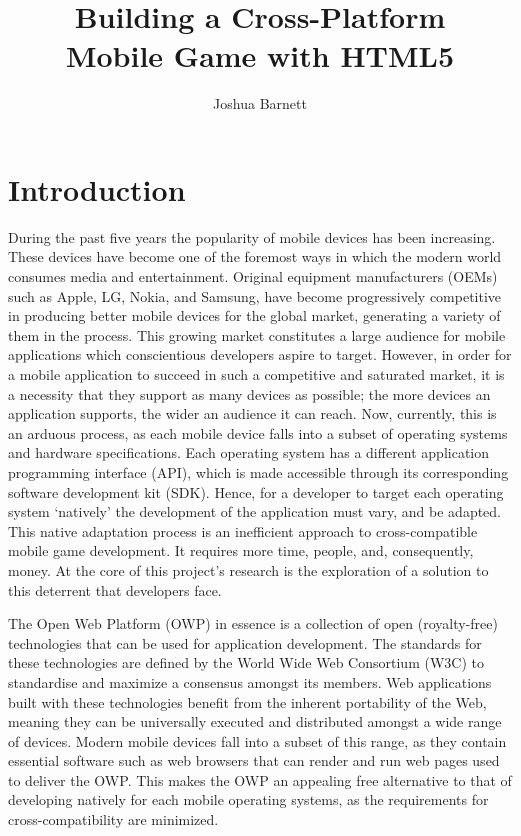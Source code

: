 \documentclass[final]{cmpreport}
\title{Building a Cross-Platform\\Mobile Game with HTML5}
\author{Joshua Barnett}
\begin{document}
\section{Introduction}
\label{sec:intro}

During the past five years the popularity of mobile devices has been increasing. These devices have become one of the foremost ways in which the modern world consumes media and entertainment. Original equipment manufacturers (OEMs) such as Apple, LG, Nokia, and Samsung, have become progressively competitive in producing better mobile devices for the global market, generating a variety of them in the process. This growing market constitutes a large audience for mobile applications which conscientious developers aspire to target. However, in order for a mobile application to succeed in such a competitive and saturated market, it is a necessity that they support as many devices as possible; the more devices an application supports, the wider an audience it can reach. Now, currently, this is an arduous process, as each mobile device falls into a subset of operating systems and hardware specifications. Each operating system has a different application programming interface (API), which is made accessible through its corresponding software development kit (SDK). Hence, for a developer to target each operating system `natively' the development of the application must vary, and be adapted. This native adaptation process is an inefficient approach to cross-compatible mobile game development. It requires more time, people, and, consequently, money. At the core of this project's research is the exploration of a solution to this deterrent that developers face.

The Open Web Platform (OWP) in essence is a collection of open (royalty-free) technologies that can be used for application development. The standards for these technologies are defined by the World Wide Web Consortium (W3C) to standardise and maximize a consensus amongst its members. Web applications built with these technologies benefit from the inherent portability of the Web, meaning they can be universally executed and distributed amongst a wide range of devices. Modern mobile devices fall into a subset of this range, as they contain essential software such as web browsers that can render and run web pages used to deliver the OWP. This makes the OWP an appealing free alternative to that of developing natively for each mobile operating systems, as the requirements for cross-compatibility are minimized.
\end{document}
